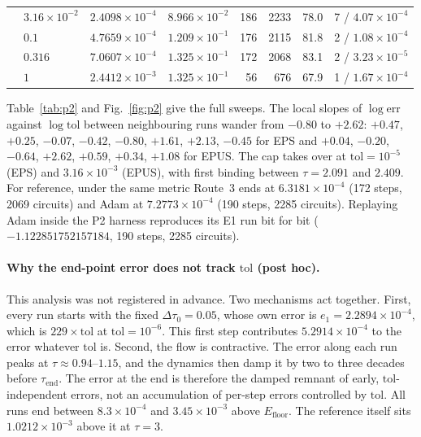\documentclass[aps,pra,reprint,superscriptaddress,nofootinbib]{revtex4-2}
\newcommand{\dt}{\Delta\tau}
\newcommand{\tol}{\mathrm{tol}}
\newcommand{\Efloor}{E_{\mathrm{floor}}}
\begin{document}
\begin{table}[t]
\begin{ruledtabular}
\begin{tabular}{lllrrrrl}
     & $3.16\times10^{-2}$ & $2.4098\times10^{-4}$ & $8.966\times10^{-2}$ & 186 & 2233 & 78.0 & 7 / $4.07\times10^{-4}$ \\
     & $0.1$ & $4.7659\times10^{-4}$ & $1.209\times10^{-1}$ & 176 & 2115 & 81.8 & 2 / $1.08\times10^{-4}$ \\
     & $0.316$ & $7.0607\times10^{-4}$ & $1.325\times10^{-1}$ & 172 & 2068 & 83.1 & 2 / $3.23\times10^{-5}$ \\
     & $1$ & $2.4412\times10^{-3}$ & $1.325\times10^{-1}$ & 56 & 676 & 67.9 & 1 / $1.67\times10^{-4}$ \\
\end{tabular}
\end{ruledtabular}
\end{table}

Table~\ref{tab:p2} and Fig.~\ref{fig:p2} give the full sweeps. The local slopes of $\log\mathrm{err}$ against
$\log\tol$ between neighbouring runs wander from $-0.80$ to $+2.62$: $+0.47$, $+0.25$, $-0.07$,
$-0.42$, $-0.80$, $+1.61$, $+2.13$, $-0.45$ for EPS and $+0.04$, $-0.20$, $-0.64$, $+2.62$, $+0.59$,
$+0.34$, $+1.08$ for EPUS. The cap takes over at $\tol=10^{-5}$ (EPS) and $3.16\times10^{-3}$
(EPUS), with first binding between $\tau=2.091$ and $2.409$. For reference, under the same
metric Route~3 ends at $6.3181\times10^{-4}$ (172 steps, 2069 circuits) and Adam at
$7.2773\times10^{-4}$ (190 steps, 2285 circuits). Replaying Adam inside the P2 harness
reproduces its E1 run bit for bit ($-1.122851752157184$, 190 steps, 2285 circuits).

\paragraph*{Why the end-point error does not track $\tol$ (post hoc).} This analysis was not
registered in advance. Two mechanisms act together. First, every run starts with the fixed
$\dt_0=0.05$, whose own error is $e_1=2.2894\times10^{-4}$, which is $229\times\tol$ at
$\tol=10^{-6}$. This first step contributes $5.2914\times10^{-4}$ to the error whatever $\tol$
is. Second, the flow is contractive. The error along each run peaks at $\tau\approx0.94$--$1.15$,
and the dynamics then damp it by two to three decades before $\tau_{\mathrm{end}}$. The error
at the end is therefore the damped remnant of early, $\tol$-independent errors, not an
accumulation of per-step errors controlled by $\tol$. All runs end between
$8.3\times10^{-4}$ and $3.45\times10^{-3}$ above $\Efloor$. The reference itself sits
$1.0212\times10^{-3}$ above it at $\tau=3$.
\end{document}
